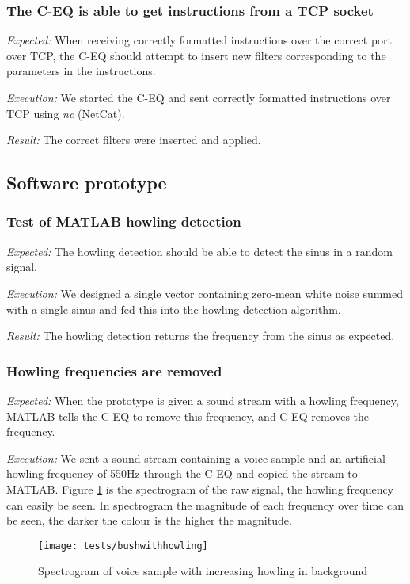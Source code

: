 \subsubsection{The C-EQ is able to get instructions from a TCP socket}
\emph{Expected:}
When receiving correctly formatted instructions over the correct port over TCP, the C-EQ should attempt to insert new filters corresponding to the parameters in the instructions.

\emph{Execution:}
We started the C-EQ and sent correctly formatted instructions over TCP using \emph{nc} (NetCat).

\emph{Result:}
The correct filters were inserted and applied.

\subsection{Software prototype}
\subsubsection{Test of MATLAB howling detection}
\emph{Expected:} The howling detection should be able to detect the sinus in a random signal.

\emph{Execution:} We designed a single vector containing zero-mean white noise summed with a single sinus and fed this into the howling detection algorithm.

\emph{Result:} The howling detection returns the frequency from the sinus as expected.
\subsubsection{Howling frequencies are removed}
\emph{Expected:}
When the prototype is given a sound stream with a howling frequency, MATLAB tells the C-EQ to remove this frequency, and C-EQ removes the frequency.

\emph{Execution:} 
We sent a sound stream containing a voice sample and an artificial howling frequency of 550Hz through the C-EQ and copied the stream to MATLAB. Figure \ref{figure:spectrogram} is the spectrogram of the raw signal, the howling frequency can easily be seen. In spectrogram the magnitude of each frequency over time can be seen, the darker the colour is the higher the magnitude.

\begin{figure}[H]
\centering
\texttt{[image: tests/bushwithhowling]}

\caption{Spectrogram of voice sample with increasing howling in background}
\label{figure:spectrogram}
\end{figure}

